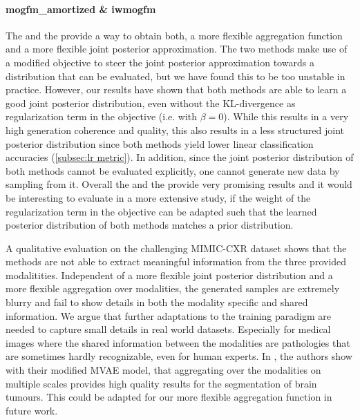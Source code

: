 \paragraph{mogfm\_amortized \& iwmogfm}
The  and the  provide a way to obtain both, a more flexible aggregation function and a more flexible joint posterior approximation.
The two methods make use of a modified objective to steer the joint posterior approximation towards a distribution that can be evaluated, but we have found this to be too unstable in practice.
However, our results have shown that both methods are able to learn a good joint posterior distribution, even without the KL-divergence as regularization term in the objective (i.e. with $\beta = 0$).
While this results in a very high generation coherence and quality, this also results in a less structured joint posterior distribution since both methods yield lower linear classification accuracies (\cref{subsec:lr metric}).
In addition, since the joint posterior distribution of both methods cannot be evaluated explicitly, one cannot generate new data by sampling from it.
Overall the  and the  provide very promising results and it would be interesting to evaluate in a more extensive study, if the weight of the regularization term in the objective can be adapted such that the learned posterior distribution of both methods matches a prior distribution.


A qualitative evaluation on the challenging MIMIC-CXR dataset shows that the methods are not able to extract meaningful information from the three provided modalitities.
Independent of a more flexible joint posterior distribution and a more flexible aggregation over modalities, the generated samples are extremely blurry and fail to show details in both the modality specific and shared information.
We argue that further adaptations to the training paradigm are needed to capture small details in real world datasets.
Especially for medical images where the shared information between the modalities are pathologies that are sometimes hardly recognizable, even for human experts.
In \citep{dorent_hetero-modal_2019}, the authors show with their modified MVAE model, that aggregating over the modalities on multiple scales provides high quality results for the segmentation of brain tumours.
This could be adapted for our more flexible aggregation function in future work.
